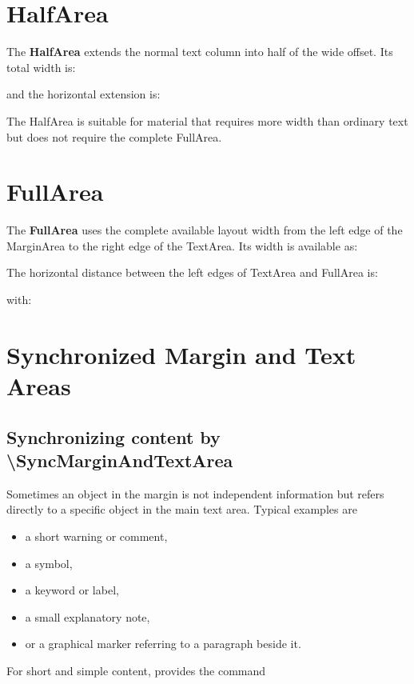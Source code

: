 \documentclass[
11pt,
a4paper,
oneside
]{scrbook}
\begin{document}
\section{HalfArea}
\begin{HalfArea}
The \textbf{HalfArea} extends the normal text column into half of the wide
offset.
Its total width is:




and the horizontal extension is:




The HalfArea is suitable for material that requires more width than ordinary
text but does not require the complete FullArea.
\end{HalfArea}

\section{FullArea}
\begin{FullArea}
The \textbf{FullArea} uses the complete available layout width from the left
edge of the MarginArea to the right edge of the TextArea.
Its width is available as:




The horizontal distance between the left edges of TextArea and FullArea is:




with:




\end{FullArea}

\section{Synchronized Margin and Text Areas}
\subsection{Synchronizing content by \textbackslash SyncMarginAndTextArea}

Sometimes an object in the margin is not independent information but
refers directly to a specific object in the main text area.
Typical examples are
\begin{itemize}
	\item a short warning or comment,
	\item a symbol,
	\item a keyword or label,
	\item a small explanatory note,
	\item or a graphical marker referring to a paragraph beside it.
\end{itemize}
For short and simple content, \MDWordmark provides the command
\end{document}
